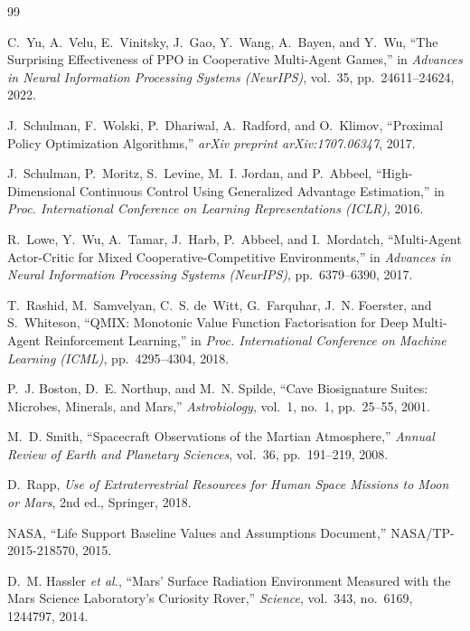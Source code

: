 \documentclass[11pt,a4paper]{article}
\begin{document}
\begin{thebibliography}{99}

C.~Yu, A.~Velu, E.~Vinitsky, J.~Gao, Y.~Wang, A.~Bayen, and Y.~Wu,
``The Surprising Effectiveness of PPO in Cooperative Multi-Agent Games,''
in \textit{Advances in Neural Information Processing Systems (NeurIPS)}, vol.~35, pp.~24611--24624, 2022.

J.~Schulman, F.~Wolski, P.~Dhariwal, A.~Radford, and O.~Klimov,
``Proximal Policy Optimization Algorithms,''
\textit{arXiv preprint arXiv:1707.06347}, 2017.

J.~Schulman, P.~Moritz, S.~Levine, M.~I. Jordan, and P.~Abbeel,
``High-Dimensional Continuous Control Using Generalized Advantage Estimation,''
in \textit{Proc. International Conference on Learning Representations (ICLR)}, 2016.

R.~Lowe, Y.~Wu, A.~Tamar, J.~Harb, P.~Abbeel, and I.~Mordatch,
``Multi-Agent Actor-Critic for Mixed Cooperative-Competitive Environments,''
in \textit{Advances in Neural Information Processing Systems (NeurIPS)}, pp.~6379--6390, 2017.

T.~Rashid, M.~Samvelyan, C.~S. de~Witt, G.~Farquhar, J.~N. Foerster, and S.~Whiteson,
``QMIX: Monotonic Value Function Factorisation for Deep Multi-Agent Reinforcement Learning,''
in \textit{Proc. International Conference on Machine Learning (ICML)}, pp.~4295--4304, 2018.

P.~J. Boston, D.~E. Northup, and M.~N. Spilde,
``Cave Biosignature Suites: Microbes, Minerals, and Mars,''
\textit{Astrobiology}, vol.~1, no.~1, pp.~25--55, 2001.

M.~D. Smith,
``Spacecraft Observations of the Martian Atmosphere,''
\textit{Annual Review of Earth and Planetary Sciences}, vol.~36, pp.~191--219, 2008.

D.~Rapp,
\textit{Use of Extraterrestrial Resources for Human Space Missions to Moon or Mars},
2nd ed., Springer, 2018.

NASA,
``Life Support Baseline Values and Assumptions Document,''
NASA/TP-2015-218570, 2015.

D.~M. Hassler \textit{et al.},
``Mars' Surface Radiation Environment Measured with the Mars Science Laboratory's Curiosity Rover,''
\textit{Science}, vol.~343, no.~6169, 1244797, 2014.


\end{thebibliography}
\end{document}
